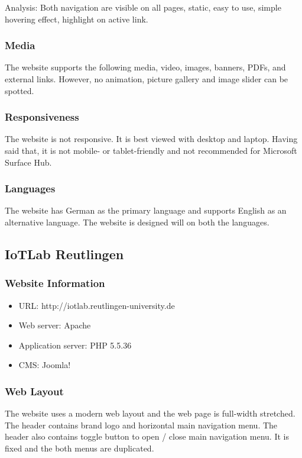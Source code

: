 Analysis: Both navigation are visible on all pages, static, easy to use, simple hovering effect, highlight on active link.

\subsubsection*{Media}
The website supports the following media, video, images, banners, PDFs, and external links. However, no animation, picture gallery and image slider can be spotted.

\subsubsection*{Responsiveness}
The website is not responsive. It is best viewed with desktop and laptop. Having said that, it is not mobile- or tablet-friendly and not recommended for Microsoft Surface Hub.

\subsubsection*{Languages}
The website has German as the primary language and supports English as an alternative language. The website is designed will on both the languages.

\subsection{IoTLab Reutlingen}
\subsubsection*{Website Information}
\begin{itemize}
\item URL: http://iotlab.reutlingen-university.de
\item Web server: Apache
\item Application server: PHP 5.5.36
\item CMS: Joomla!
\end{itemize}

\subsubsection*{Web Layout}
The website uses a modern web layout and the web page is full-width stretched. The header contains brand logo and horizontal main navigation menu. The header also contains toggle button to open / close main navigation menu. It is fixed and the both menus are duplicated.

